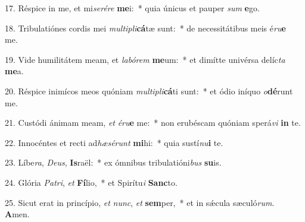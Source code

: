 17. Réspice in me, et mi\textit{se}\textit{ré}\textit{re} \textbf{me}i:~*  quia únicus et pauper \textit{sum} \textbf{e}go.\

18. Tribulatiónes cordis mei \textit{mul}\textit{ti}\textit{pli}\textbf{cá}tæ sunt:~*  de necessitátibus meis é\textit{ru}\textbf{e} me.\

19. Vide humilitátem meam, et \textit{la}\textit{bó}\textit{rem} \textbf{me}um:~*  et dimítte univérsa delíc\textit{ta} \textbf{me}a.\

20. Réspice inimícos meos quóniam \textit{mul}\textit{ti}\textit{pli}\textbf{cá}ti sunt:~*  et ódio iníquo \textit{o}\textbf{dé}runt me.\

21. Custódi ánimam meam, \textit{et} \textit{é}\textit{ru}\textbf{e} me:~*  non erubéscam quóniam sperá\textit{vi} \textbf{in} te.\

22. Innocéntes et recti ad\textit{hæ}\textit{sé}\textit{runt} \textbf{mi}hi:~*  quia sustí\textit{nu}\textbf{i} te.\

23. Líbe\textit{ra}, \textit{De}\textit{us}, \textbf{Is}raël:~*  ex ómnibus tribulatióni\textit{bus} \textbf{su}is.\

24. Glória \textit{Pa}\textit{tri}, \textit{et} \textbf{Fí}lio,~*  et Spirítu\textit{i} \textbf{Sanc}to.\

25. Sicut erat in princípio, \textit{et} \textit{nunc}, \textit{et} \textbf{sem}per,~*  et in sǽcula sæculó\textit{rum}. \textbf{A}men.\

